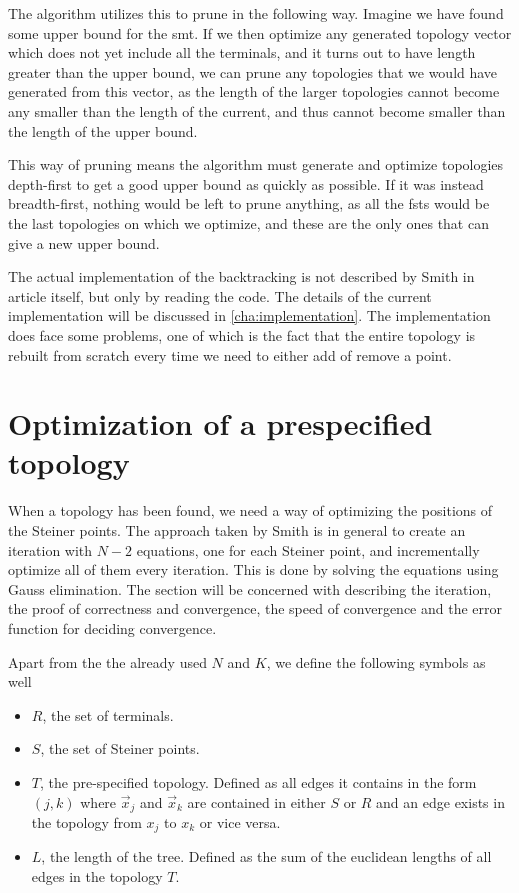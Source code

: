 The algorithm utilizes this to prune in the following way. Imagine we have
found some upper bound for the \gls{smt}. If we then optimize any generated
topology vector which does not yet include all the terminals, and it turns out
to have length greater than the upper bound, we can prune any topologies that we
would have generated from this vector, as the length of the larger topologies
cannot become any smaller than the length of the current, and thus cannot become
smaller than the length of the upper bound.

This way of pruning means the algorithm must generate and optimize topologies
depth-first to get a good upper bound as quickly as possible. If it was instead
breadth-first, nothing would  be left to prune anything, as all the \glspl{fst}
would be the last topologies on which we optimize, and these are the only ones
that can give a new upper bound.

The actual implementation of the backtracking is not described by Smith in
article itself, but only by reading the code. The details of the current
implementation will be discussed in \cref{cha:implementation}. The
implementation does face some problems, one of which is the fact that the entire
topology is rebuilt from scratch every time we need to either add of remove a
point.

\section{Optimization of a prespecified topology}
\label{sec:optim-presp-topol}

When a topology has been found, we need a way of optimizing the positions of the
Steiner points. The approach taken by Smith is in general to create an
iteration with $N-2$ equations, one for each Steiner point, and incrementally
optimize all of them every iteration. This is done by solving the equations
using Gauss elimination. The section will be concerned with describing the
iteration, the proof of correctness and convergence, the speed of convergence
and the error function for deciding convergence.

Apart from the the already used $N$ and $K$, we define the following symbols as
well
%
\begin{itemize}
\item $R$, the set of terminals.
\item $S$, the set of Steiner points.
\item $T$, the pre-specified topology. Defined as all edges it contains in the
form $(j,k)$ where $\vec x_j$ and $\vec x_k$ are contained in either $S$ or $R$
and an edge exists in the topology from $x_j$ to $x_k$ or vice versa.
\item $L$, the length of the tree. Defined as the sum of the euclidean lengths
of all edges in the topology $T$.
\end{itemize}

